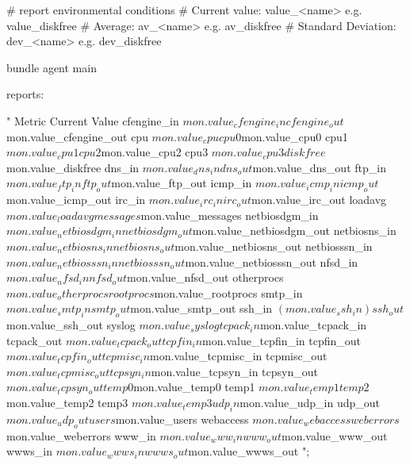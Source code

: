 \begin{codelisting}
\begin{code}
# report environmental conditions
# Current value: value_<name>       e.g. value_diskfree
# Average: av_<name>                e.g. av_diskfree
# Standard Deviation: dev_<name>    e.g. dev_diskfree

bundle agent main
{
  reports:

      "
Metric     Current Value
cfengine_in    ${mon.value_cfengine_in}
cfengine_out   ${mon.value_cfengine_out}
cpu            ${mon.value_cpu}
cpu0           ${mon.value_cpu0}
cpu1           ${mon.value_cpu1}
cpu2           ${mon.value_cpu2}
cpu3           ${mon.value_cpu3}
diskfree       ${mon.value_diskfree}
dns_in         ${mon.value_dns_in}
dns_out        ${mon.value_dns_out}
ftp_in         ${mon.value_ftp_in}
ftp_out        ${mon.value_ftp_out}
icmp_in        ${mon.value_icmp_in}
icmp_out       ${mon.value_icmp_out}
irc_in         ${mon.value_irc_in}
irc_out        ${mon.value_irc_out}
loadavg        ${mon.value_loadavg}
messages       ${mon.value_messages}
netbiosdgm_in  ${mon.value_netbiosdgm_in}
netbiosdgm_out ${mon.value_netbiosdgm_out}
netbiosns_in   ${mon.value_netbiosns_in}
netbiosns_out  ${mon.value_netbiosns_out}
netbiosssn_in  ${mon.value_netbiosssn_in}
netbiosssn_out ${mon.value_netbiosssn_out}
nfsd_in        ${mon.value_nfsd_in}
nfsd_out       ${mon.value_nfsd_out}
otherprocs     ${mon.value_otherprocs}
rootprocs      ${mon.value_rootprocs}
smtp_in        ${mon.value_smtp_in}
smtp_out       ${mon.value_smtp_out}
ssh_in         $(mon.value_ssh_in)
ssh_out        ${mon.value_ssh_out}
syslog         ${mon.value_syslog}
tcpack_in      ${mon.value_tcpack_in}
tcpack_out     ${mon.value_tcpack_out}
tcpfin_in      ${mon.value_tcpfin_in}
tcpfin_out     ${mon.value_tcpfin_out}
tcpmisc_in     ${mon.value_tcpmisc_in}
tcpmisc_out    ${mon.value_tcpmisc_out}
tcpsyn_in      ${mon.value_tcpsyn_in}
tcpsyn_out     ${mon.value_tcpsyn_out}
temp0          ${mon.value_temp0}
temp1          ${mon.value_temp1}
temp2          ${mon.value_temp2}
temp3          ${mon.value_temp3}
udp_in         ${mon.value_udp_in}
udp_out        ${mon.value_udp_out}
users          ${mon.value_users}
webaccess      ${mon.value_webaccess}
weberrors      ${mon.value_weberrors}
www_in         ${mon.value_www_in}
www_out        ${mon.value_www_out}
wwws_in        ${mon.value_wwws_in}
wwws_out       ${mon.value_wwws_out}
";
}
\end{code}
\end{codelisting}
